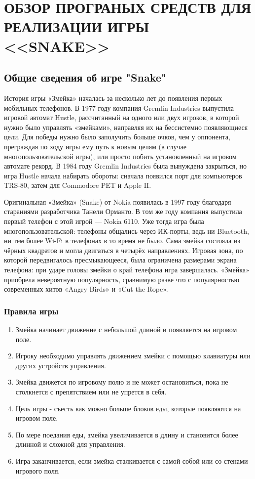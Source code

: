 \chapter{\label{ch:ch01}ОБЗОР ПРОГРАНЫХ СРЕДСТВ ДЛЯ РЕАЛИЗАЦИИ ИГРЫ <<SNAKE>>} %

\section{\label{sec:ch01/sec01}Общие сведения об игре "Snake"}

История игры «Змейка» началась за несколько лет до появления первых мобильных телефонов. В 1977 году компания Gremlin Industries выпустила игровой автомат Hustle, рассчитанный на одного или двух игроков, в которой нужно было управлять «змейками», направляя их на бессистемно появляющиеся цели. Для победы нужно было заполучить больше очков, чем у оппонента, преграждая по ходу игры ему путь к новым целям (в случае многопользовательской игры), или просто побить установленный на игровом автомате рекорд. В 1984 году Gremlin Industries была вынуждена закрыться, но игра Hustle начала набирать обороты: сначала появился порт для компьютеров TRS-80, затем для Commodore PET и Apple II.

Оригинальная «Змейка» (Snake) от Nokia появилась в 1997 году благодаря стараниями разработчика Танели Орманто. В том же году компания выпустила первый телефон с этой игрой — Nokia 6110. Уже тогда игра была многопользовательской: телефоны общались через ИК-порты, ведь ни Bluetooth, ни тем более Wi-Fi в телефонах в то время не было. Сама змейка состояла из чёрных квадратов и могла двигаться в четырёх направлениях. Игровая зона, по которой передвигалось пресмыкающееся, была ограничена размерами экрана телефона: при ударе головы змейки о край телефона игра завершалась. «Змейка» приобрела невероятную популярность, сравнимую разве что с популярностью современных хитов «Angry Birds» и «Cut the Rope».

\subsection{\label{subsec:ch01/sec01/sub01}Правила игры}

\begin{enumerate}
    \item Змейка начинает движение с небольшой длиной и появляется на игровом поле.
    \item Игроку необходимо управлять движением змейки с помощью клавиатуры или других устройств управления.
    \item Змейка движется по игровому полю и не может остановиться, пока не столкнется с препятствием или не упрется в себя.
    \item Цель игры - съесть как можно больше блоков еды, которые появляются на игровом поле.
    \item По мере поедания еды, змейка увеличивается в длину и становится более длинной и сложной для управления.
    \item Игра заканчивается, если змейка сталкивается с самой собой или со стенами игрового поля.
\end{enumerate}

